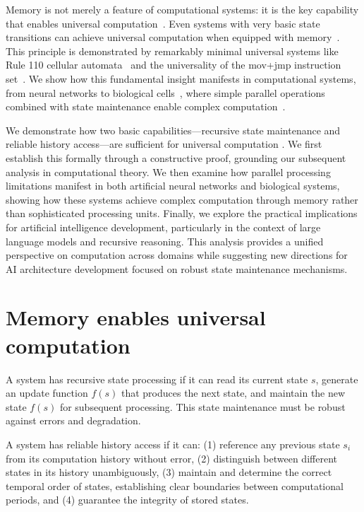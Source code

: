 \documentclass[12pt]{article}
\begin{document}
Memory is not merely a feature of computational systems: it is the key capability that enables universal computation~\cite{turing1936computable}.
Even systems with very basic state transitions can achieve universal computation when equipped with memory~\cite{merrill2023parallelism,peng2024limitations}.
This principle is demonstrated by remarkably minimal universal systems like Rule 110 cellular automata~\cite{cook2004universality} and the universality of the mov+jmp instruction set~\cite{savage1994space}.
We show how this fundamental insight manifests in computational systems, from neural networks to biological cells~\cite{wang2023parallel}, where simple parallel operations combined with state maintenance enable complex computation~\cite{swamy1983space,bisaz2024memory}.

We demonstrate how two basic capabilities---recursive state maintenance and reliable history access---are sufficient for universal computation \cite{savage1994space,bennett1989time}.
We first establish this formally through a constructive proof, grounding our subsequent analysis in computational theory.
We then examine how parallel processing limitations manifest in both artificial neural networks and biological systems, showing how these systems achieve complex computation through memory rather than sophisticated processing units.
Finally, we explore the practical implications for artificial intelligence development, particularly in the context of large language models and recursive reasoning.
This analysis provides a unified perspective on computation across domains while suggesting new directions for AI architecture development focused on robust state maintenance mechanisms.

\section{Memory enables universal computation}

A system has recursive state processing if it can read its current state $s$, generate an update function $f(s)$ that produces the next state, and maintain the new state $f(s)$ for subsequent processing.
This state maintenance must be robust against errors and degradation.

A system has reliable history access if it can: (1) reference any previous state $s_i$ from its computation history without error, (2) distinguish between different states in its history unambiguously, (3) maintain and determine the correct temporal order of states, establishing clear boundaries between computational periods, and (4) guarantee the integrity of stored states.
\end{document}
